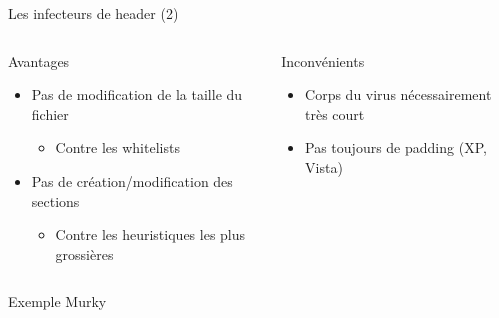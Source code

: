 \documentclass{beamer}
\begin{document}
\begin{frame}{Les infecteurs de header (2)}
\begin{columns}[t]
\begin{column}{4cm}
Avantages
\begin{itemize}
\item Pas de modification de la taille du fichier
\begin{itemize}
\item Contre les whitelists
\end{itemize}
\item Pas de création/modification des sections
\begin{itemize}
\item Contre les heuristiques les plus grossières
\end{itemize}
\end{itemize}
\end{column}
\begin{column}{5cm}
\item Inconvénients
\begin{itemize}
\item Corps du virus nécessairement très court
\item Pas toujours de padding (XP, Vista)
\end{itemize}
\end{column}
\end{columns}
\begin{alertblock}{Exemple}
Murky
\end{alertblock}
\end{frame}
\end{document}
